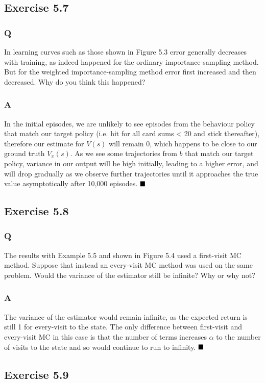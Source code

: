 \subsection{Exercise 5.7}
\subsubsection{Q}
In learning curves such as those shown in Figure 5.3 error generally decreases with training, as indeed happened for the ordinary importance-sampling method. But for the weighted importance-sampling method error first increased and then decreased. Why do you think this happened?
\subsubsection{A}
In the initial episodes, we are unlikely to see episodes from the behaviour policy that match our target policy (i.e. hit for all card sums < 20 and stick thereafter), therefore our estimate for $V(s)$ will remain 0, which happens to be close to our ground truth $V_\pi(s)$. As we see some trajectories from $b$ that match our target policy, variance in our output will be high initially, leading to a higher error, and will drop gradually as we observe further trajectories until it approaches the true value asymptotically after 10,000 episodes.
$
\hfill \blacksquare
$

\subsection{Exercise 5.8}
\subsubsection{Q}
The results with Example 5.5 and shown in Figure 5.4 used a first-visit MC method. Suppose that instead an every-visit MC method was used on the same problem. Would the variance of the estimator still be infinite? Why or why not?
\subsubsection{A}
The variance of the estimator would remain infinite, as the expected return is still 1 for every-visit to the state. The only difference between first-visit and every-visit MC in this case is that the number of terms increases $\alpha$ to the number of visits to the state and so would continue to run to infinity.
$
\hfill \blacksquare
$

\subsection{Exercise 5.9}

